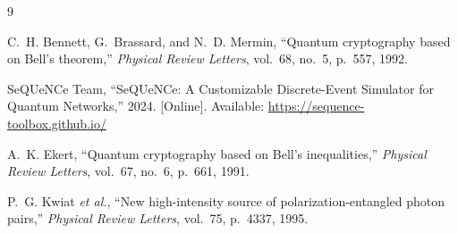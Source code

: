 \documentclass[12pt,oneside,letterpaper,english]{article}
\begin{document}
\newpage
{}
\begin{thebibliography}{9}

C.~H. Bennett, G.~Brassard, and N.~D. Mermin,
``Quantum cryptography based on Bell's theorem,''
\textit{Physical Review Letters}, vol.~68, no.~5, p.~557, 1992.

SeQUeNCe Team,
``SeQUeNCe: A Customizable Discrete-Event Simulator for Quantum Networks,'' 2024.
[Online]. Available: \url{https://sequence-toolbox.github.io/}

A.~K. Ekert,
``Quantum cryptography based on Bell's inequalities,''
\textit{Physical Review Letters}, vol.~67, no.~6, p.~661, 1991.

P.~G. Kwiat \textit{et al.},
``New high-intensity source of polarization-entangled photon pairs,''
\textit{Physical Review Letters}, vol.~75, p.~4337, 1995.

\end{thebibliography}
\end{document}
